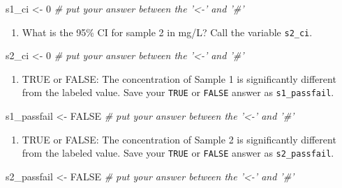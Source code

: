 \documentclass[]{tufte-book}
\newenvironment{Shaded}{}{}
\newcommand{\CommentTok}[1]{\textcolor[rgb]{0.38,0.63,0.69}{\textit{#1}}}
\newcommand{\DecValTok}[1]{\textcolor[rgb]{0.25,0.63,0.44}{#1}}
\newcommand{\NormalTok}[1]{#1}
\newcommand{\OtherTok}[1]{\textcolor[rgb]{0.00,0.44,0.13}{#1}}
\newcommand{\StringTok}[1]{\textcolor[rgb]{0.25,0.44,0.63}{#1}}
\providecommand{\tightlist}{%
  \setlength{\itemsep}{0pt}\setlength{\parskip}{0pt}}
\begin{document}
\begin{Shaded}
\begin{Highlighting}[]
\NormalTok{s1_ci <-}\StringTok{ }\DecValTok{0}     \CommentTok{# put your answer between the '<-' and '#'}
\end{Highlighting}
\end{Shaded}

\begin{enumerate}
\def\labelenumi{\arabic{enumi}.}
\setcounter{enumi}{8}
\tightlist
\item
  What is the 95\% CI for sample 2 in mg/L? Call the variable \texttt{s2\_ci}.
\end{enumerate}

\begin{Shaded}
\begin{Highlighting}[]
\NormalTok{s2_ci <-}\StringTok{ }\DecValTok{0}     \CommentTok{# put your answer between the '<-' and '#'}
\end{Highlighting}
\end{Shaded}

\begin{enumerate}
\def\labelenumi{\arabic{enumi}.}
\setcounter{enumi}{9}
\tightlist
\item
  TRUE or FALSE: The concentration of Sample 1 is significantly different from the labeled value. Save your \texttt{TRUE} or \texttt{FALSE} answer as \texttt{s1\_passfail}.
\end{enumerate}

\begin{Shaded}
\begin{Highlighting}[]
\NormalTok{s1_passfail <-}\StringTok{ }\OtherTok{FALSE}     \CommentTok{# put your answer between the '<-' and '#'}
\end{Highlighting}
\end{Shaded}

\begin{enumerate}
\def\labelenumi{\arabic{enumi}.}
\setcounter{enumi}{10}
\tightlist
\item
  TRUE or FALSE: The concentration of Sample 2 is significantly different from the labeled value. Save your \texttt{TRUE} or \texttt{FALSE} answer as \texttt{s2\_passfail}.
\end{enumerate}

\begin{Shaded}
\begin{Highlighting}[]
\NormalTok{s2_passfail <-}\StringTok{ }\OtherTok{FALSE}     \CommentTok{# put your answer between the '<-' and '#'}
\end{Highlighting}
\end{Shaded}
\end{document}
